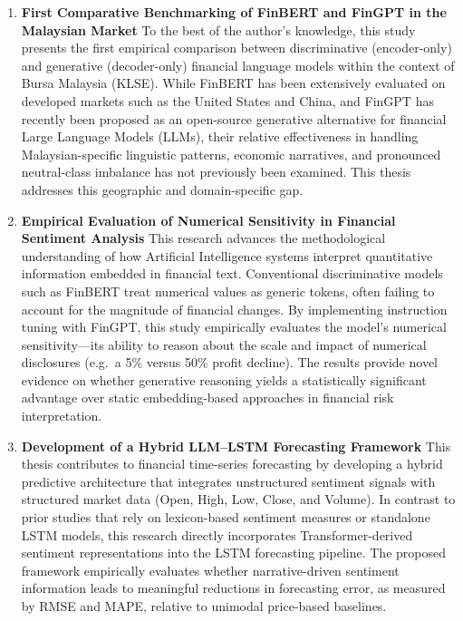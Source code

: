 \documentclass[singlespace]{ucetd}
\begin{document}
\begin{enumerate}
    \item \textbf{First Comparative Benchmarking of FinBERT and FinGPT in the Malaysian Market}  
    To the best of the author’s knowledge, this study presents the first empirical comparison between discriminative (encoder-only) and generative (decoder-only) financial language models within the context of Bursa Malaysia (KLSE). While FinBERT has been extensively evaluated on developed markets such as the United States and China, and FinGPT has recently been proposed as an open-source generative alternative for financial Large Language Models (LLMs), their relative effectiveness in handling Malaysian-specific linguistic patterns, economic narratives, and pronounced neutral-class imbalance has not previously been examined. This thesis addresses this geographic and domain-specific gap.

    \item \textbf{Empirical Evaluation of Numerical Sensitivity in Financial Sentiment Analysis}  
    This research advances the methodological understanding of how Artificial Intelligence systems interpret quantitative information embedded in financial text. Conventional discriminative models such as FinBERT treat numerical values as generic tokens, often failing to account for the magnitude of financial changes. By implementing instruction tuning with FinGPT, this study empirically evaluates the model’s numerical sensitivity—its ability to reason about the scale and impact of numerical disclosures (e.g.\ a 5\% versus 50\% profit decline). The results provide novel evidence on whether generative reasoning yields a statistically significant advantage over static embedding-based approaches in financial risk interpretation.

    \item \textbf{Development of a Hybrid LLM--LSTM Forecasting Framework}  
    This thesis contributes to financial time-series forecasting by developing a hybrid predictive architecture that integrates unstructured sentiment signals with structured market data (Open, High, Low, Close, and Volume). In contrast to prior studies that rely on lexicon-based sentiment measures or standalone LSTM models, this research directly incorporates Transformer-derived sentiment representations into the LSTM forecasting pipeline. The proposed framework empirically evaluates whether narrative-driven sentiment information leads to meaningful reductions in forecasting error, as measured by RMSE and MAPE, relative to unimodal price-based baselines.


\end{enumerate}
\end{document}

